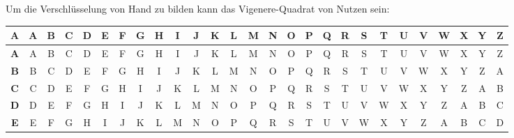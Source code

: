 				Um die Verschlüsselung von Hand zu bilden kann das Vigenere-Quadrat von Nutzen sein:
				\begin{table}[H]
					\centering
					\tiny
					\begin{tabular}{|c||c|c|c|c|c|c|c|c|c|c|c|c|c|c|c|c|c|c|c|c|c|c|c|c|c|c|}
						\hline
						\textbf{A} & \textbf{A} & \textbf{B} & \textbf{C} & \textbf{D} & \textbf{E} & \textbf{F} & \textbf{G} & \textbf{H} & \textbf{I} & \textbf{J} & \textbf{K} & \textbf{L} & \textbf{M} & \textbf{N} & \textbf{O} & \textbf{P} & \textbf{Q} & \textbf{R} & \textbf{S} & \textbf{T} & \textbf{U} & \textbf{V} & \textbf{W} & \textbf{X} & \textbf{Y} & \textbf{Z} \\ \hline \hline
						\textbf{A} & A          & B          & C          & D          & E          & F          & G          & H          & I          & J          & K          & L          & M          & N          & O          & P          & Q          & R          & S          & T          & U          & V          & W          & X          & Y          & Z          \\ \hline
						\textbf{B} & B          & C          & D          & E          & F          & G          & H          & I          & J          & K          & L          & M          & N          & O          & P          & Q          & R          & S          & T          & U          & V          & W          & X          & Y          & Z          & A          \\ \hline
						\textbf{C} & C          & D          & E          & F          & G          & H          & I          & J          & K          & L          & M          & N          & O          & P          & Q          & R          & S          & T          & U          & V          & W          & X          & Y          & Z          & A          & B          \\ \hline
						\textbf{D} & D          & E          & F          & G          & H          & I          & J          & K          & L          & M          & N          & O          & P          & Q          & R          & S          & T          & U          & V          & W          & X          & Y          & Z          & A          & B          & C          \\ \hline
						\textbf{E} & E          & F          & G          & H          & I          & J          & K          & L          & M          & N          & O          & P          & Q          & R          & S          & T          & U          & V          & W          & X          & Y          & Z          & A          & B          & C          & D          \\ \hline

\end{tabular}
\end{table}

